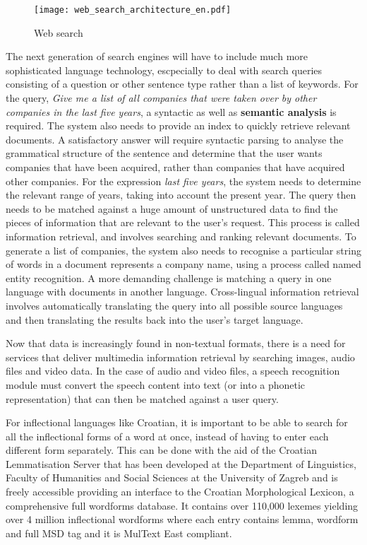 \begin{multicols}{2}
\begin{figure*}[t]
  \center
  \texttt{[image: web\_search\_architecture\_en.pdf]}
  \caption{Web search}
  \label{fig:websearcharch_en}
 \end{figure*}


The next generation of search engines will have to include much more sophisticated language technology, escpecially to deal with search queries consisting of a question or other sentence type rather than a list of keywords. For the query, \emph{Give me a list of all companies that were taken over by other companies in the last five years}, a syntactic as well as \textbf{semantic analysis} is required. The system also needs to provide an index to quickly retrieve relevant documents. A satisfactory answer will require syntactic parsing to analyse the grammatical structure of the sentence and determine that the user wants companies that have been acquired, rather than companies that have acquired other companies. For the expression \emph{last five years}, the system needs to determine the relevant range of years, taking into account the present year. The query then needs to be matched against a huge amount of unstructured data to find the pieces of information that are relevant to the user’s request. This process is called information retrieval, and involves searching and ranking relevant documents. To generate a list of companies, the system also needs to recognise a particular string of words in a document represents a company name, using a process called named entity recognition. A more demanding challenge is matching a query in one language with documents in another language. Cross-lingual information retrieval involves automatically translating the query into all possible source languages and then translating the results back into the user’s target language.

Now that data is increasingly found in non-textual formats, there is a need for services that deliver multimedia information retrieval by searching images, audio files and video data. In the case of audio and video files, a speech recognition module must convert the speech content into text (or into a phonetic representation) that can then be matched against a user query.

For inflectional languages like Croatian, it is important to be able to search for all the inflectional forms of a word at once, instead of having to enter each different form separately. This can be done with the aid of the Croatian Lemmatisation Server that has been developed at the Department of Linguistics, Faculty of Humanities and Social Sciences at the University of Zagreb and is freely accessible \cite{str16} providing an interface to the Croatian Morphological Lexicon, a comprehensive full wordforms database. It contains over 110,000 lexemes yielding over 4 million inflectional wordforms where each entry contains lemma, wordform and full MSD tag and it is MulText East \cite{str17} compliant.


\end{multicols}
